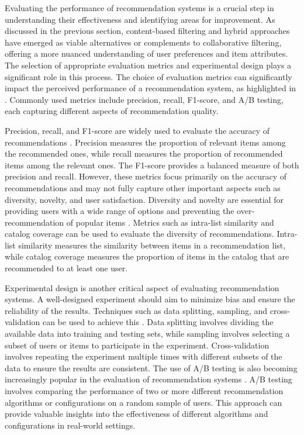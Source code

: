 \documentclass[11pt,a4paper]{article}
\begin{document}
Evaluating the performance of recommendation systems is a crucial step in understanding their effectiveness and identifying areas for improvement. As discussed in the previous section, content-based filtering and hybrid approaches have emerged as viable alternatives or complements to collaborative filtering, offering a more nuanced understanding of user preferences and item attributes. The selection of appropriate evaluation metrics and experimental design plays a significant role in this process. The choice of evaluation metrics can significantly impact the perceived performance of a recommendation system, as highlighted in \cite{arxiv:cs/0506075}. Commonly used metrics include precision, recall, F1-score, and A/B testing, each capturing different aspects of recommendation quality.

Precision, recall, and F1-score are widely used to evaluate the accuracy of recommendations \cite{doi:10.1155/2009/421425}. Precision measures the proportion of relevant items among the recommended ones, while recall measures the proportion of recommended items among the relevant ones. The F1-score provides a balanced measure of both precision and recall. However, these metrics focus primarily on the accuracy of recommendations and may not fully capture other important aspects such as diversity, novelty, and user satisfaction. Diversity and novelty are essential for providing users with a wide range of options and preventing the over-recommendation of popular items \cite{doi:10.1073/pnas.1000488107}. Metrics such as intra-list similarity and catalog coverage can be used to evaluate the diversity of recommendations. Intra-list similarity measures the similarity between items in a recommendation list, while catalog coverage measures the proportion of items in the catalog that are recommended to at least one user.

Experimental design is another critical aspect of evaluating recommendation systems. A well-designed experiment should aim to minimize bias and ensure the reliability of the results. Techniques such as data splitting, sampling, and cross-validation can be used to achieve this \cite{arxiv:1407.0822}. Data splitting involves dividing the available data into training and testing sets, while sampling involves selecting a subset of users or items to participate in the experiment. Cross-validation involves repeating the experiment multiple times with different subsets of the data to ensure the results are consistent. The use of A/B testing is also becoming increasingly popular in the evaluation of recommendation systems \cite{doi:10.1073/pnas.1000488107}. A/B testing involves comparing the performance of two or more different recommendation algorithms or configurations on a random sample of users. This approach can provide valuable insights into the effectiveness of different algorithms and configurations in real-world settings.
\end{document}
